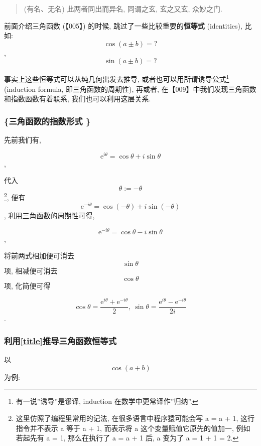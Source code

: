 \begin{quote}
(有名、无名) 此两者同出而异名, 同谓之玄, 玄之又玄, 众妙之门.
\end{quote}

前面介绍三角函数 (【005】) 的时候, 跳过了一些比较重要的\textbf{恒等式}
(identities), 比如: \[\cos (a\pm b)=?\], \[\sin (a\pm  b)=?\]

事实上这些恒等式可以从纯几何出发去推导,
或者也可以用所谓诱导公式\footnote{有一说''诱导''是谬译, induction
  在数学中更常译作''归纳''.} (induction formula, 即三角函数的周期性),
再或者, 在【009】中我们发现三角函数和指数函数有着联系,
我们也可以利用这层关系.

\hypertarget{ux4e09ux89d2ux51fdux6570ux7684ux6307ux6570ux5f62ux5f0f}{%
\subsubsection{\texorpdfstring{\{三角函数的指数形式
\label{title}\}}{\{三角函数的指数形式 \}}}\label{ux4e09ux89d2ux51fdux6570ux7684ux6307ux6570ux5f62ux5f0f}}

先前我们有,

\[\mathrm{e}^{i\theta}=\cos \theta+i\sin \theta\],

代入 \[\theta:=-\theta\]\footnote{这里仿照了编程里常用的记法,
  在很多语言中程序猿可能会写 a = a + 1, 这行指令并不表示 a 等于 a + 1,
  而表示将 a 这个变量赋值它原先的值加一, 例如若起先有 a = 1,
  那么在执行了 a = a + 1 后, a 变为了 a = 1 + 1 = 2.}, 便有
\[\mathrm{e}^{-i\theta}=\cos (-\theta)+i\sin (-\theta)\],
利用三角函数的周期性可得,

\[\mathrm{e}^{-i\theta}=\cos \theta-i\sin \theta\],

将前两式相加便可消去 \[\sin\theta\] 项, 相减便可消去 \[\cos\theta\] 项,
化简便可得

\[\boxed{\cos\theta=\frac{\mathrm{e}^{i\theta}+\mathrm{e}^{-i\theta}}{2},\ \sin\theta=\frac{\mathrm{e}^{i\theta}-\mathrm{e}^{-i\theta}}{2i}}\].

\hypertarget{ux5229ux7528ux63a8ux5bfcux4e09ux89d2ux51fdux6570ux6052ux7b49ux5f0f}{%
\subsubsection{\texorpdfstring{利用\ref{title}推导三角函数恒等式}{利用推导三角函数恒等式}}\label{ux5229ux7528ux63a8ux5bfcux4e09ux89d2ux51fdux6570ux6052ux7b49ux5f0f}}

以 \[\cos (a+b)\] 为例:

